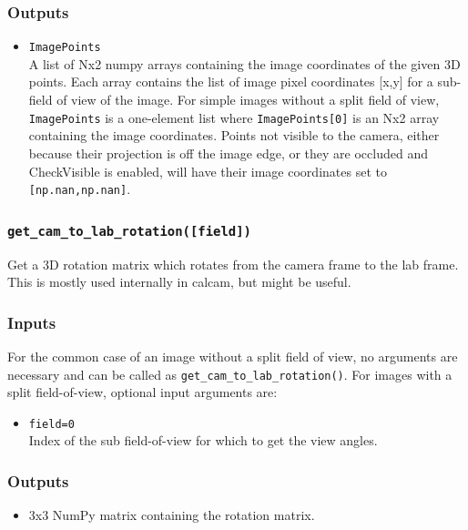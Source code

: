 \documentclass[12pt]{article}
\newcommand{\code}[1]{\texttt{#1}}
\begin{document}
\begin{adjustwidth}{0.5cm}{0cm}
\subsubsection*{Outputs} 
\begin{itemize}
\item{\code{ImagePoints}\\A list of Nx2 numpy arrays containing the image coordinates of the given 3D points. Each array contains the list of image pixel coordinates [x,y] for a sub-field of view of the image. For simple images without a split field of view, \code{ImagePoints} is a one-element list where \code{ImagePoints[0]} is an Nx2 array containing the image coordinates. Points not visible to the camera, either because their projection is off the image edge, or they are occluded and CheckVisible is enabled, will have their image coordinates set to \code{[np.nan,np.nan]}. }
\end{itemize}
\end{adjustwidth}

\subsubsection*{\code{get\_cam\_to\_lab\_rotation([field])}}
\begin{adjustwidth}{0.5cm}{0cm}
Get a 3D rotation matrix which rotates from the camera frame to the lab frame. This is mostly used internally in calcam, but might be useful.
\subsubsection*{Inputs}
For the common case of an image without a split field of view, no arguments are necessary and can be called as \code{get\_cam\_to\_lab\_rotation()}. For images with a split field-of-view, optional input arguments are:
\begin{itemize}
\item{\code{field=0}\\Index of the sub field-of-view for which to get the view angles.}
\end{itemize}
\subsubsection*{Outputs} 
\begin{itemize}
\item{3x3 NumPy matrix containing the rotation matrix.}
\end{itemize}
\end{adjustwidth}
\end{document}
